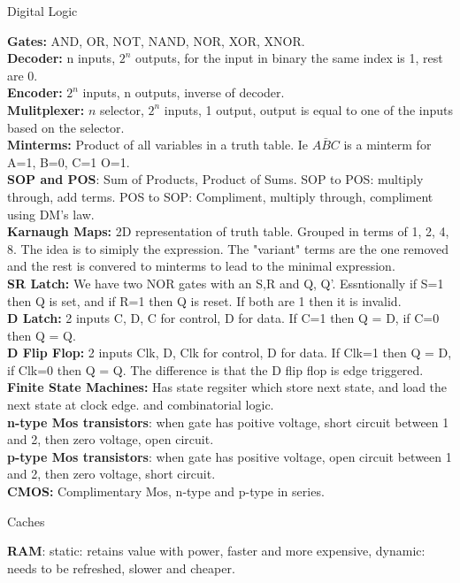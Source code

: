 \documentclass[answers,12pt,addpoints]{exam}
\begin{document}
\newpage
\begin{center}
    Digital Logic
\end{center}
\textbf{Gates:} AND, OR, NOT, NAND, NOR, XOR, XNOR. \\
\textbf{Decoder:} n inputs, $2^n$ outputs, for the input in binary the same index is 1, rest are 0. \\
\textbf{Encoder:} $2^n$ inputs, n outputs, inverse of decoder. \\
\textbf{Mulitplexer:} $n$ selector, $2^n$ inputs, 1 output, output is equal to one of the inputs based on the selector. \\
\textbf{Minterms:} Product of all variables in a truth table. Ie $A\bar{B}C$ is a minterm for A=1, B=0, C=1 O=1. \\
\textbf{SOP and POS}: Sum of Products, Product of Sums. SOP to POS: multiply through, add terms. POS to SOP: Compliment, multiply through, compliment using DM's law. \\
\textbf{Karnaugh Maps:} 2D representation of truth table. Grouped in terms of 1, 2, 4, 8. The idea is to simiply the expression. The "variant" terms are the one removed and the rest is convered to minterms to lead to the minimal expression. \\
\textbf{SR Latch:} We have two NOR gates with an S,R and Q, Q'. Essntionally if S=1 then Q is set, and if R=1 then Q is reset. If both are 1 then it is invalid. \\
\textbf{D Latch:} 2 inputs C, D, C for control, D for data. If C=1 then Q = D, if C=0 then Q = Q. \\
\textbf{D Flip Flop:} 2 inputs Clk, D, Clk for control, D for data. If Clk=1 then Q = D, if Clk=0 then Q = Q. The difference is that the D flip flop is edge triggered. \\
\textbf{Finite State Machines:} Has state regsiter which store next state, and load the next state at clock edge. and combinatorial logic.\\
\textbf{n-type Mos transistors}: when gate has poitive voltage, short circuit between 1 and 2, then zero voltage, open circuit. \\
\textbf{p-type Mos transistors}: when gate has positive voltage, open circuit between 1 and 2, then zero voltage, short circuit. \\
\textbf{CMOS:} Complimentary Mos, n-type and p-type in series. 
\begin{center}
    Caches
\end{center}
\textbf{RAM}: static: retains value with power, faster and more expensive, dynamic: needs to be refreshed, slower and cheaper. \\
\end{document}
